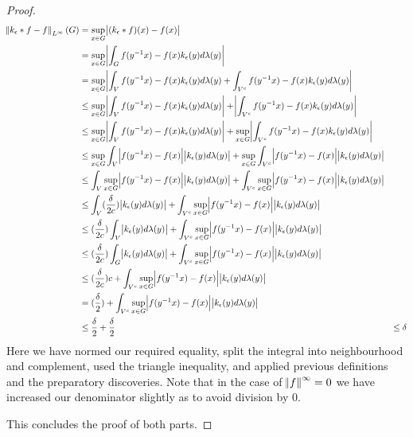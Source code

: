 \begin{proof}
\begin{align*}
\norm{k_\epsilon \ast f -f}_{L^\infty}(G) &= \sup_{x\in G} \abs{(k_\epsilon \ast f)(x)-f(x)} \\
&= \sup_{x\in G} \abs{\int_G f(y^{-1}x)-f(x) k_\epsilon(y) d\lambda(y)}\\
&= \sup_{x\in G} \abs{\int_V f(y^{-1}x)-f(x) k_\epsilon(y) d\lambda(y) + \int_{V^c} f(y^{-1}x)-f(x) k_\epsilon(y) d\lambda(y)}\\
&\leq \sup_{x\in G} \abs{\int_V f(y^{-1}x)-f(x) k_\epsilon(y) d\lambda(y)} + \abs{\int_{V^c} f(y^{-1}x)-f(x) k_\epsilon(y) d\lambda(y)} \\
&\leq \sup_{x\in G} \abs{\int_V f(y^{-1}x)-f(x) k_\epsilon(y) d\lambda(y)} + \sup_{x\in G} \abs{\int_{V^c} f(y^{-1}x)-f(x) k_\epsilon(y) d\lambda(y)} \\
&\leq \sup_{x\in G} \int_V \abs{f(y^{-1}x)-f(x)}\abs{ k_\epsilon(y) d\lambda(y)} + \sup_{x\in G} \int_{V^c}\abs{ f(y^{-1}x)-f(x)}\abs{ k_\epsilon(y) d\lambda(y)}\\
&\leq  \int_V \sup_{x\in G}\abs{f(y^{-1}x)-f(x)}\abs{ k_\epsilon(y) d\lambda(y)} +  \int_{V^c}\sup_{x\in G}\abs{ f(y^{-1}x)-f(x)}\abs{ k_\epsilon(y) d\lambda(y)}\\
&\leq  \int_V (\frac{\delta}{2c}) \abs{ k_\epsilon(y) d\lambda(y)} +  \int_{V^c}\sup_{x\in G}\abs{ f(y^{-1}x)-f(x)}\abs{ k_\epsilon(y) d\lambda(y)}\\
&\leq (\frac{\delta}{2c}) \int_V  \abs{ k_\epsilon(y) d\lambda(y)} +  \int_{V^c}\sup_{x\in G}\abs{ f(y^{-1}x)-f(x)}\abs{ k_\epsilon(y) d\lambda(y)}\\
&\leq (\frac{\delta}{2c}) \int_G  \abs{ k_\epsilon(y) d\lambda(y)} +  \int_{V^c}\sup_{x\in G}\abs{ f(y^{-1}x)-f(x)}\abs{ k_\epsilon(y) d\lambda(y)}\\
&\leq (\frac{\delta}{2c}) c +  \int_{V^c}\sup_{x\in G}\abs{ f(y^{-1}x)-f(x)}\abs{ k_\epsilon(y) d\lambda(y)}\\
&= (\frac{\delta}{2}) +  \int_{V^c}\sup_{x\in G}\abs{ f(y^{-1}x)-f(x)}\abs{ k_\epsilon(y) d\lambda(y)}\\
&\leq \frac{\delta}{2} + \frac{\delta}{2}
&\leq \delta
\end{align*}
Here we have normed our required equality, split the integral into neighbourhood and complement, used the triangle inequality, and applied previous definitions and the preparatory discoveries. Note that in the case of $\norm{f}^\infty = 0$ we have increased our denominator slightly as to avoid division by $0$.

This concludes the proof of both parts.
\end{proof}

